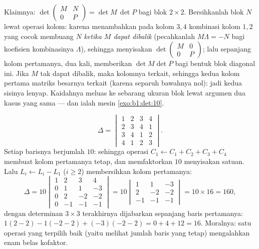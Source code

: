 \begin{example}
\label{ex:b1:det:blocktriangular}
Klaimnya: $\det\begin{pmatrix} M & N\\ 0 & P\end{pmatrix} = \det
M\,\det P$ bagi blok $2\times2$. Bersihkanlah blok $N$ lewat operasi
kolom: karena menambahkan pada kolom $3, 4$ kombinasi kolom
$1, 2$ yang cocok membuang $N$ \emph{ketika $M$ dapat dibalik} (pecahkanlah
$M\Lambda = -N$ bagi koefisien kombinasinya $\Lambda$),
sehingga menyisakan $\det\begin{pmatrix} M & 0\\ 0 & P\end{pmatrix}$; lalu
 sepanjang kolom pertamanya, dua kali, memberikan $\det
M\det P$ bagi bentuk blok diagonal ini. Jika $M$ tak
dapat dibalik, maka kolomnya terkait, sehingga kedua kolom pertama
matriks besarnya terkait (karena separuh bawahnya nol): jadi kedua
sisinya lenyap. Kaidahnya meluas ke sebarang ukuran blok lewat argumen
dua kasus yang sama --- dan ialah mesin
\cref{exo:b1:det:10}.
\end{example}

\begin{example}
\label{ex:b1:det:fourbyfour}
\[
\Delta = \begin{vmatrix}
1 & 2 & 3 & 4\\
2 & 3 & 4 & 1\\
3 & 4 & 1 & 2\\
4 & 1 & 2 & 3
\end{vmatrix}.
\]
Setiap barisnya berjumlah $10$: sehingga operasi $C_1 \leftarrow C_1 + C_2 +
C_3 + C_4$ membuat kolom pertamanya tetap, dan memfaktorkan $10$
menyisakan satuan. Lalu $L_i \leftarrow L_i - L_1$ ($i \geq 2$) membersihkan
kolom pertamanya:
\[
\Delta = 10\begin{vmatrix}
1 & 2 & 3 & 4\\
0 & 1 & 1 & -3\\
0 & 2 & -2 & -2\\
0 & -1 & -1 & -1
\end{vmatrix}
= 10\begin{vmatrix}
1 & 1 & -3\\
2 & -2 & -2\\
-1 & -1 & -1
\end{vmatrix}
= 10 \times 16 = 160,
\]
dengan determinan $3\times3$ terakhirnya dijabarkan sepanjang baris pertamanya:
$1(2 - 2) - 1(-2 - 2) + (-3)(-2 - 2) = 0 + 4 + 12 = 16$. Moralnya:
satu operasi yang terpilih baik (yaitu melihat jumlah baris yang tetap) mengalahkan
enam belas kofaktor.
\end{example}

